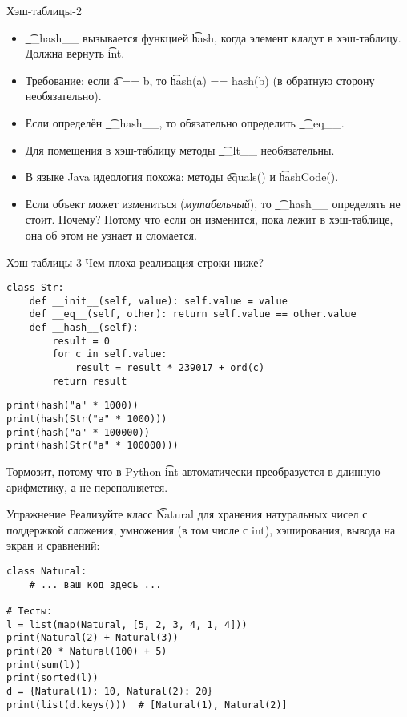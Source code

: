 \begin{frame}{Хэш-таблицы-2}
	\begin{itemize}
		\item
			\t{\_\_hash\_\_} вызывается функцией \t{hash}, когда элемент кладут в хэш-таблицу.
			Должна вернуть \t{int}.
		\item
			Требование: если \t{a == b}, то \t{hash(a) == hash(b)} (в обратную сторону необязательно).
		\item
			Если определён \t{\_\_hash\_\_}, то обязательно определить \t{\_\_eq\_\_}.
		\item
			Для помещения в хэш-таблицу методы \t{\_\_lt\_\_} необязательны.
		\item
			В языке Java идеология похожа: методы \t{equals()} и \t{hashCode()}.
		\item
			Если объект может измениться (\textit{мутабельный}), то \t{\_\_hash\_\_} определять не стоит.
			Почему?
			\pause
			Потому что если он изменится, пока лежит в хэш-таблице, она об этом не узнает и сломается.
	\end{itemize}
\end{frame}

\begin{frame}[fragile]{Хэш-таблицы-3}
	Чем плоха реализация строки ниже?
\begin{verbatim}
class Str:
    def __init__(self, value): self.value = value
    def __eq__(self, other): return self.value == other.value
    def __hash__(self):
        result = 0
        for c in self.value:
            result = result * 239017 + ord(c)
        return result
\end{verbatim}
	\pause
\begin{verbatim}
print(hash("a" * 1000))
print(hash(Str("a" * 1000)))
print(hash("a" * 100000))
print(hash(Str("a" * 100000)))
\end{verbatim}
	\pause
	Тормозит, потому что в Python \t{int} автоматически преобразуется в длинную арифметику,
	а не переполняется.
\end{frame}

\begin{frame}[fragile]{Упражнение}
	Реализуйте класс \t{Natural} для хранения натуральных чисел с поддержкой сложения, умножения (в том числе с int), хэширования, вывода на экран и сравнений:
\begin{verbatim}
class Natural:
    # ... ваш код здесь ...

# Тесты:
l = list(map(Natural, [5, 2, 3, 4, 1, 4]))
print(Natural(2) + Natural(3))
print(20 * Natural(100) + 5)
print(sum(l))
print(sorted(l))
d = {Natural(1): 10, Natural(2): 20}
print(list(d.keys()))  # [Natural(1), Natural(2)]
\end{verbatim}
\end{frame}
